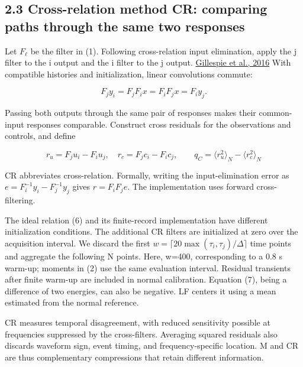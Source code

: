 \documentclass[10pt,a4paper]{article}
\begin{document}
\subsection{2.3 Cross-relation method CR: comparing paths through the same two responses}

Let \(F_\ell\) be the filter in (1). Following cross-relation input elimination, apply the j filter to the i output and the i filter to the j output. \href{https://doi.org/10.1016/j.ifacol.2016.07.087}{Gillespie et al., 2016} With compatible histories and initialization, linear convolutions commute:

\begin{equation}
F_jy_i=F_jF_ix=F_iF_jx=F_iy_j.
\tag{6}
\end{equation}

Passing both outputs through the same pair of responses makes their common-input responses comparable. Construct cross residuals for the observations and controls, and define

\begin{equation}
r_u=F_ju_i-F_iu_j,\quad r_c=F_jc_i-F_ic_j,\qquad
q_C=\langle r_u^2\rangle_N-\langle r_c^2\rangle_N
\tag{7}
\end{equation}

CR abbreviates cross-relation. Formally, writing the input-elimination error as \(e=F_i^{-1}y_i-F_j^{-1}y_j\) gives \(r=F_iF_je\). The implementation uses forward cross-filtering.

The ideal relation (6) and its finite-record implementation have different initialization conditions. The additional CR filters are initialized at zero over the acquisition interval. We discard the first \(w=\lceil20\max(\tau_i,\tau_j)/\Delta\rceil\) time points and aggregate the following N points. Here, w=400, corresponding to a 0.8 s warm-up; moments in (2) use the same evaluation interval. Residual transients after finite warm-up are included in normal calibration. Equation (7), being a difference of two energies, can also be negative. LF centers it using a mean estimated from the normal reference.

CR measures temporal disagreement, with reduced sensitivity possible at frequencies suppressed by the cross-filters. Averaging squared residuals also discards waveform sign, event timing, and frequency-specific location. M and CR are thus complementary compressions that retain different information.
\end{document}
